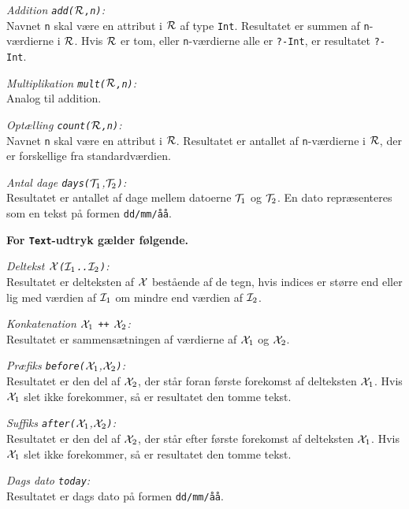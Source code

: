 {\em Addition \verb"add("$\cal R$\verb",n)":}\\
Navnet \verb"n" skal v\ae{}re en attribut i $\cal R$ af type \verb"Int".
Resultatet er summen af \verb"n"-v\ae{}rdierne i $\cal R$. Hvis 
$\cal R$ er tom, eller \verb"n"-v\ae{}rdierne alle er \verb"?-Int", er
resultatet \verb"?-Int".

{\em Multiplikation \verb"mult("$\cal R$\verb",n)":}\\
Analog til addition.

{\em Opt\ae{}lling \verb"count("$\cal R$\verb",n)":}\\
Navnet \verb"n" skal v\ae{}re en attribut i $\cal R$.
Resultatet er antallet af \verb"n"-v\ae{}rdierne i $\cal R$, der er
forskellige fra standardv\ae{}rdien.

{\em Antal dage \verb"days("${\cal T}_1$,${\cal T}_2$\verb")":}\\
Resultatet er antallet af dage mellem datoerne ${\cal T}_1$ og ${\cal T}_2$.
En dato repr\ae{}senteres som en tekst p\aa{} formen {\tt dd/mm/\aa{}\aa{}}.

{\bf For \verb"Text"-udtryk g\ae{}lder f\o{}lgende.}

{\em Deltekst $\cal X$\verb"("${\cal I}_1$\verb".."${\cal I}_2$\verb")":}\\
Resultatet er delteksten af $\cal X$ best\aa{}ende af de tegn, hvis
indices er st\o{}rre end eller lig med v\ae{}rdien af 
${\cal I}_1$ om mindre end v\ae{}rdien af ${\cal I}_2$.

{\em Konkatenation ${\cal X}_1$ \verb"++" ${\cal X}_2$:}\\
Resultatet er sammens\ae{}tningen af v\ae{}rdierne af
${\cal X}_1$ og ${\cal X}_2$.

{\em Pr\ae{}fiks \verb"before("${\cal X}_1$,${\cal X}_2$\verb")":}\\
Resultatet er den del af ${\cal X}_2$, der st\aa{}r foran f\o{}rste forekomst af
delteksten ${\cal X}_1$. Hvis ${\cal X}_1$ slet ikke forekommer, s\aa{} er
resultatet den tomme tekst.

{\em Suffiks \verb"after("${\cal X}_1$,${\cal X}_2$\verb")":}\\
Resultatet er den del af ${\cal X}_2$, der st\aa{}r efter f\o{}rste forekomst af
delteksten ${\cal X}_1$. Hvis ${\cal X}_1$ slet ikke forekommer, s\aa{} er
resultatet den tomme tekst.

{\em Dags dato \verb"today":}\\
Resultatet er dags dato p\aa{} formen {\tt dd/mm/\aa{}\aa{}}.

